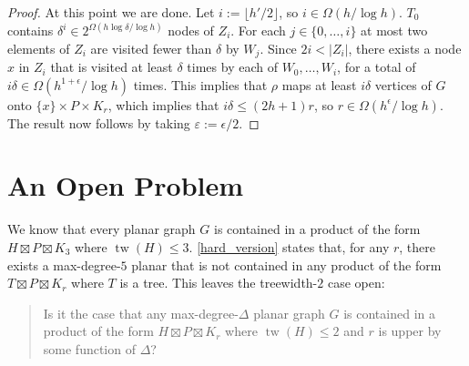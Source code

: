 \documentclass{patmorin}
\DeclareMathOperator{\tw}{tw}
\begin{document}
\begin{proof}
  At this point we are done.  Let $i:=\lfloor h'/2\rfloor$, so $i\in\Omega(h/\log h)$.  $T_0$ contains $\delta^i \in 2^{\Omega(h\log\delta/\log h)}$  nodes of $Z_i$.  For each $j\in\{0,\ldots,i\}$ at most two elements of $Z_i$ are visited fewer than $\delta$ by $W_j$.  Since $2i < |Z_i|$, there exists a node $x$ in $Z_i$ that is visited at least $\delta$ times by each of $W_0,\ldots,W_i$, for a total of $i\delta \in \Omega(h^{1+\epsilon}/\log h)$ times. This implies that $\rho$ maps at least $i\delta$ vertices of $G$ onto $\{x \}\times P\times K_r$, which implies that $i\delta\le (2h+1)r$, so $r\in\Omega(h^\epsilon/\log h)$.  The result now follows by taking $\varepsilon := \epsilon/2$.
\end{proof}


\section{An Open Problem}

We know that every planar graph $G$ is contained in a product of the form $H\boxtimes P\boxtimes K_3$ where $\tw(H)\le 3$. \cref{hard_version} states that, for any $r$, there exists a max-degree-$5$ planar that is not contained in any product of the form $T\boxtimes P\boxtimes K_r$ where $T$ is a tree.  This leaves the treewidth-$2$ case open:

\begin{quote}
  Is it the case that any max-degree-$\Delta$ planar graph $G$ is contained in a product of the form $H\boxtimes P\boxtimes K_r$ where $\tw(H)\le 2$ and $r$ is upper by some function of $\Delta$?
\end{quote}



\end{document}
